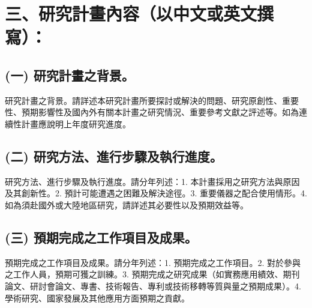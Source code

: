 \documentclass[a4paper, 12pt]{article}
\begin{document}
\section*{三、研究計畫內容（以中文或英文撰寫）：} 

\subsection*{(一) 研究計畫之背景。}研究計畫之背景。請詳述本研究計畫所要探討或解決的問題、研究原創性、重要性、預期影響性及國內外有關本計畫之研究情況、重要參考文獻之評述等。如為連續性計畫應說明上年度研究進度。

\subsection*{(二) 研究方法、進行步驟及執行進度。}	
研究方法、進行步驟及執行進度。請分年列述：1. 本計畫採用之研究方法與原因及其創新性。2. 預計可能遭遇之困難及解決途徑。3. 重要儀器之配合使用情形。4. 如為須赴國外或大陸地區研究，請詳述其必要性以及預期效益等。

\subsection*{(三) 預期完成之工作項目及成果。}
預期完成之工作項目及成果。請分年列述：1. 預期完成之工作項目。2. 對於參與之工作人員，預期可獲之訓練。3. 預期完成之研究成果（如實務應用績效、期刊論文、研討會論文、專書、技術報告、專利或技術移轉等質與量之預期成果）。4. 學術研究、國家發展及其他應用方面預期之貢獻。
\end{document}
